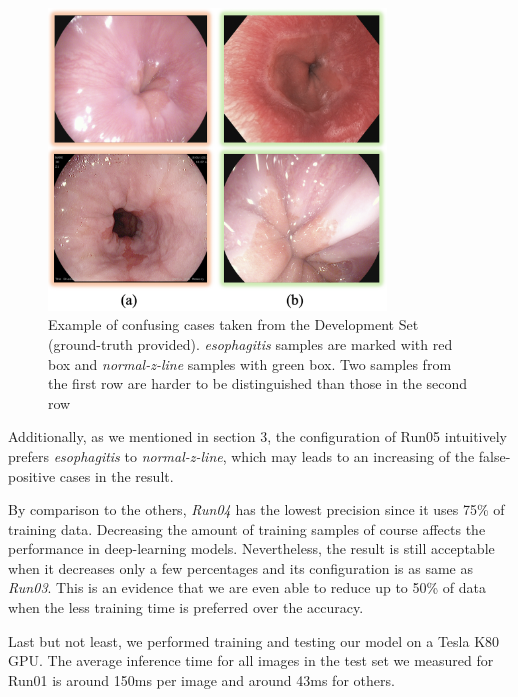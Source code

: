\begin{figure}[thb]
\begin{center}
\includegraphics[width=0.8\textwidth]{endoscopy_resources/confusing_cases.png}
\end{center}
   \caption{Example of confusing cases taken from the Development Set (ground-truth provided). \textit{esophagitis} samples are marked with red box and \textit{normal-z-line} samples with green box. Two samples from the first row are harder to be distinguished than those in the second row}
\label{fig:confusing}
\end{figure}

Additionally, as we mentioned in section 3, the configuration of Run05 intuitively prefers \textit{esophagitis} to \textit{normal-z-line}, which may leads to an increasing of the false-positive cases in the result.

By comparison to the others, \textit{Run04} has the lowest precision since it uses 75\% of training data. Decreasing the amount of training samples of course affects the performance in deep-learning models. Nevertheless, the result is still acceptable when it decreases only a few percentages and its configuration is as same as \textit{Run03}. This is an evidence that we are even able to reduce up to 50\% of data when the less training time is preferred over the accuracy.

Last but not least, we performed training and testing our model on a Tesla K80 GPU. The average inference time for all images in the test set we measured for Run01 is around 150ms per image and around 43ms for others. 

